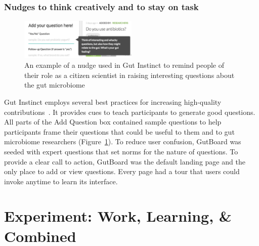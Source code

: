 \subsubsection{Nudges to think creatively and to stay on task}
\begin{figure}[h]
  \centering
  \includegraphics[width=0.5\textwidth]{figures/gutinstinct/gi-5.png}
  \caption[An example of a nudge used in Gut Instinct]
{An example of a nudge used in Gut Instinct to remind people of their role as a citizen scientist in raising interesting questions about the gut microbiome }
  \label{fig:gi-5}
\end{figure} 
Gut Instinct employs several best practices for increasing high-quality contributions~\cite{Jennett2014, Resnick2011}. It provides cues to teach participants to generate good questions. All parts of the Add Question box contained sample questions to help participants frame their questions that could be useful to them and to gut microbiome researchers (Figure~\ref{fig:gi-5}). To reduce user confusion, GutBoard was seeded with expert questions that set norms for the nature of questions. To provide a clear call to action, GutBoard was the default landing page and the only place to add or view questions. Every page had a tour that users could invoke anytime to learn its interface.


\section{Experiment: Work, Learning, \& Combined}

